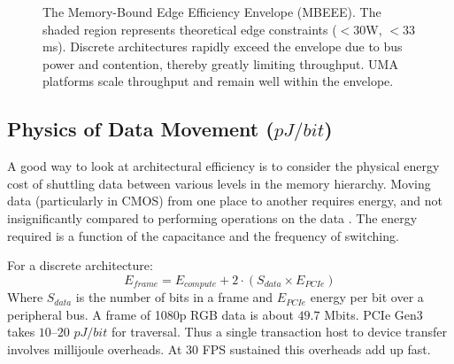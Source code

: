 \documentclass[conference]{IEEEtran}
\begin{document}
\begin{figure}[htbp]
\centering
{}
\caption{The Memory-Bound Edge Efficiency Envelope (MBEEE). The shaded region represents theoretical edge constraints ($< 30$W, $< 33$ms). Discrete architectures rapidly exceed the envelope due to bus power and contention, thereby greatly limiting throughput. UMA platforms scale throughput and remain well within the envelope.}
\label{fig:mbeee}
\end{figure}

\subsection{Physics of Data Movement ($pJ/bit$)}
A good way to look at architectural efficiency is to consider the physical energy cost of shuttling data between various levels in the memory hierarchy. Moving data (particularly in CMOS) from one place to another requires energy, and not insignificantly compared to performing operations on the data \cite{b8}. The energy required is a function of the capacitance and the frequency of switching.

For a discrete architecture:
\begin{equation}
E_{frame} = E_{compute} + 2 \cdot (S_{data} \times E_{PCIe})
\end{equation}
Where $S_{data}$ is the number of bits in a frame and $E_{PCIe}$ energy per bit over a peripheral bus. A frame of 1080p RGB data is about $49.7$ Mbits. PCIe Gen3 takes $10$--$20$ $pJ/bit$ for traversal. Thus a single transaction host to device transfer involves millijoule overheads. At 30 FPS sustained this overheads add up fast.
\end{document}
